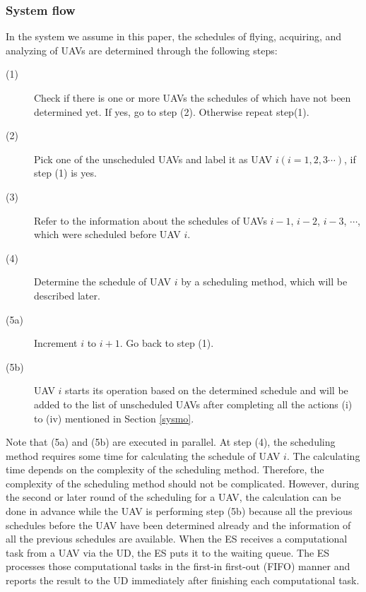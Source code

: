 \documentclass{ieeeaccess}
\begin{document}
\subsubsection{System flow}\label{flow}
In the system we assume in this paper, the schedules of flying, acquiring, and analyzing of UAVs are determined through the following steps:
%
\begin{description}
\item[(1)] Check if there is one or more UAVs the schedules of which have not been determined yet. If yes, go to step (2). Otherwise repeat step(1).
\item[(2)] Pick one of the unscheduled UAVs and label it as UAV $i (i=1, 2, 3\cdots)$, if step (1) is yes.
\item[(3)] Refer to the information about the schedules of UAVs $i-1$, $i-2$, $i-3$, $\cdots$, which were scheduled before UAV $i$.
\item[(4)] Determine the schedule of UAV $i$ by a scheduling method, which will be described later.
\item[(5a)] Increment $i$ to $i+1$. Go back to step (1).
\item[(5b)] UAV $i$ starts its operation based on the determined schedule and will be added to the list of unscheduled UAVs after completing all the actions\hspace{-0.5mm} (i) to (i\hspace{-.1em}v) mentioned in Section \ref{sysmo}.
\end{description}
%
Note that (5a) and (5b) are executed in parallel.
%
At step (4), the scheduling method requires some time for calculating the schedule of UAV $i$.
%
The calculating time depends on the complexity of the scheduling method.
%
Therefore, the complexity of the scheduling method should not be complicated.
%
However, during the second or later round of the scheduling for a UAV, the calculation can be done in advance while the UAV is performing step (5b) because all the previous schedules before the UAV have been determined already and the information of all the previous schedules are available.
%
%
When the ES receives a computational task from a UAV via the UD, the ES puts it to the waiting queue.
%
The ES processes those computational tasks in the first-in first-out (FIFO) manner and reports the result to the UD immediately after finishing each computational task.
\end{document}
